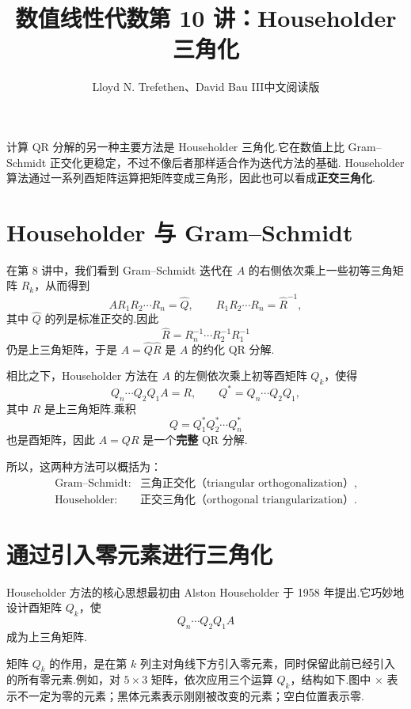 \documentclass[UTF8,fontset=none,12pt]{ctexart}
\title{数值线性代数\quad 第 10 讲：Householder 三角化}
\author{Lloyd N. Trefethen、David Bau III\quad 中文阅读版}
\date{}
\begin{document}
\maketitle
\pagestyle{plain}

计算 QR 分解的另一种主要方法是 Householder 三角化.它在数值上比 Gram--Schmidt 正交化更稳定，不过不像后者那样适合作为迭代方法的基础. Householder 算法通过一系列酉矩阵运算把矩阵变成三角形，因此也可以看成\textbf{正交三角化}.

\section*{Householder 与 Gram--Schmidt}

在第 8 讲中，我们看到 Gram--Schmidt 迭代在 $A$ 的右侧依次乘上一些初等三角矩阵 $R_k$，从而得到
\begin{equation}
    A R_1R_2\cdots R_n=\widehat Q,
    \qquad
    R_1R_2\cdots R_n=\widehat R^{-1},
\end{equation}
其中 $\widehat Q$ 的列是标准正交的.因此
\[
    \widehat R=R_n^{-1}\cdots R_2^{-1}R_1^{-1}
\]
仍是上三角矩阵，于是 $A=\widehat Q\widehat R$ 是 $A$ 的约化 QR 分解.

相比之下，Householder 方法在 $A$ 的左侧依次乘上初等酉矩阵 $Q_k$，使得
\begin{equation}
    Q_n\cdots Q_2Q_1A=R,
    \qquad
    Q^*=Q_n\cdots Q_2Q_1,
\end{equation}
其中 $R$ 是上三角矩阵.乘积
\[
    Q=Q_1^*Q_2^*\cdots Q_n^*
\]
也是酉矩阵，因此 $A=QR$ 是一个\textbf{完整} QR 分解.

所以，这两种方法可以概括为：
\[
\begin{array}{ll}
\text{Gram--Schmidt:}&\text{三角正交化（triangular orthogonalization）},\\
\text{Householder:}&\text{正交三角化（orthogonal triangularization）}.
\end{array}
\]

\section*{通过引入零元素进行三角化}

Householder 方法的核心思想最初由 Alston Householder 于 1958 年提出.它巧妙地设计酉矩阵 $Q_k$，使
\[
    Q_n\cdots Q_2Q_1A
\]
成为上三角矩阵.

矩阵 $Q_k$ 的作用，是在第 $k$ 列主对角线下方引入零元素，同时保留此前已经引入的所有零元素.例如，对 $5\times3$ 矩阵，依次应用三个运算 $Q_k$，结构如下.图中 $\times$ 表示不一定为零的元素；黑体元素表示刚刚被改变的元素；空白位置表示零.
\end{document}
